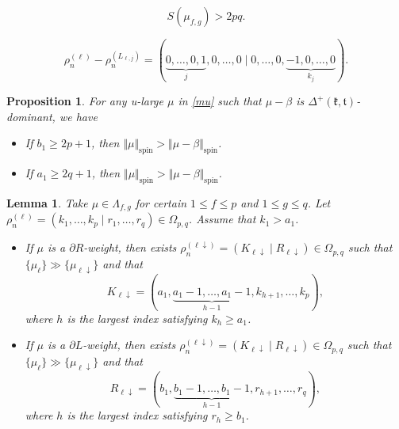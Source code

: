 \documentclass[10pt,a4paper]{amsart}
\newtheorem{prop}{Proposition}
\newtheorem{lemma}{Lemma}
\newcommand{\frk}{\mathfrak{k}}
\newcommand{\frt}{\mathfrak{t}}
\begin{document}
\begin{equation}\label{sum-mufg}
S(\mu_{f, g})> 2pq.
\end{equation}

\begin{equation}\label{eq5}
\rho_n^{(\ell)}-\rho_n^{(L_{\ell, j})}=(\underbrace{0,\dots,0,1}_{j},0,\dots,0\mid 0,\dots,0,\underbrace{-1,0,\dots,0}_{k_{j}}).\end{equation}

\begin{prop}\label{prop-2p+1}
	For any u-large $\mu$ in \eqref{mu} such that $\mu-\beta$ is $\Delta^+(\frk,\frt)$-dominant, we have
	\begin{itemize}
		\item[(a)] If $b_1\ge 2p+1$, then $\Vert\mu\Vert_{\mathrm{spin}}>\Vert\mu-\beta\Vert_{\mathrm{spin}}$.
		\item[(b)] If $a_1\ge 2q+1$, then $\Vert\mu\Vert_{\mathrm{spin}}>\Vert\mu-\beta\Vert_{\mathrm{spin}}$.
	\end{itemize}
\end{prop}

\begin{lemma}\label{lemma-down}
Take $\mu\in \Lambda_{f, g}$ for certain $1\leq f\leq p$ and $1\leq g\leq q$.
Let $\rho_n^{(\ell)}=(k_1,\dots,k_p\mid r_1,\dots,r_q)\in\Omega_{p,q}$. Assume that $k_1>a_1$.
	\begin{itemize}
		\item[(a)] If $\mu$ is a $\partial R$-weight, then exists  $\rho_n^{(\ell\downarrow)}=(K_{\ell\downarrow}\mid R_{\ell\downarrow})\in\Omega_{p, q}$ such that $\{\mu_\ell\}\gg\{\mu_{\ell\downarrow}\}$ and that
		\[K_{\ell\downarrow}=(a_1, \underbrace{a_1-1, \dots, a_1-1}_{h-1}, k_{h+1}, \dots, k_p),\]
		where $h$ is the largest index satisfying $k_h\ge a_1$.
		\item[(b)] If $\mu$ is a $\partial L$-weight, then exists $\rho_n^{(\ell\downarrow)}=(K_{\ell\downarrow}\mid R_{\ell\downarrow})\in\Omega_{p, q}$ such that $\{\mu_\ell\}\gg\{\mu_{\ell\downarrow}\}$ and that
		\[R_{\ell\downarrow}=(b_1, \underbrace{b_1-1, \dots, b_1-1}_{h-1}, r_{h+1}, \dots, r_q),\]
		where $h$ is the largest index satisfying $r_h\ge b_1$.
	\end{itemize}
\end{lemma}
\end{document}
